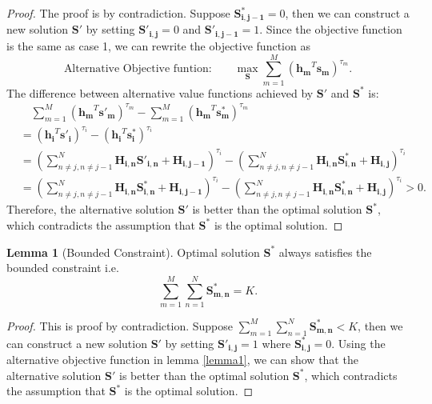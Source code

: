 \documentclass[12pt]{article}
\theoremstyle{definition}
\newtheorem{lemma}[theorem]{Lemma}
\newcommand{\matr}[1]{\mathbf{#1}} %
\begin{document}
\begin{sloppypar}
\begin{proof}
    The proof is by contradiction. Suppose $\matr{S^*_{i,j-1}} = 0$, then we can construct a new solution $\matr{S'}$ by setting $\matr{S'_{i,j}} = 0$ and $\matr{S'_{i,j-1}} = 1$. Since the objective function is the same as case 1, we can rewrite the objective function as 
    \begin{equation}
        \text{Alternative Objective funtion:} \qquad \max_{\matr{S}} \sum_{m=1}^{M}(\matr{h_m}^T \matr{s_m})^{\tau_m}.
    \end{equation}
    The difference between alternative value functions achieved by $\matr{S'}$ and $\matr{S^*}$ is:
    \begin{equation*}
    \begin{aligned}
        &\quad \sum_{m=1}^{M}(\matr{h_m}^T \matr{s'_m})^{\tau_m} - \sum_{m=1}^{M}(\matr{h_m}^T \matr{s^*_m})^{\tau_m} \\
        &= (\matr{h_i}^T \matr{s'_i})^{\tau_i} - (\matr{h_i}^T \matr{s^*_i})^{\tau_i} \\
        &= (\sum\limits_{n \neq j, n \neq j-1}^{N} \matr{H_{i,n}} \matr{S'_{i,n}}+\matr{H_{i,j-1}})^{\tau_i} - (\sum\limits_{n \neq j, n \neq j-1}^{N} \matr{H_{i,n}} \matr{S^*_{i,n}}+\matr{H_{i,j}})^{\tau_i}\\
        &= (\sum\limits_{n \neq j, n \neq j-1}^{N} \matr{H_{i,n}} \matr{S^*_{i,n}}+\matr{H_{i,j-1}})^{\tau_i} - (\sum\limits_{n \neq j, n \neq j-1}^{N} \matr{H_{i,n}} \matr{S^*_{i,n}}+\matr{H_{i,j}})^{\tau_i}> 0.
    \end{aligned}
    \end{equation*}
    Therefore, the alternative solution $\matr{S'}$ is better than the optimal solution $\matr{S^*}$, which contradicts the assumption that $\matr{S^*}$ is the optimal solution.
\end{proof}

\begin{lemma}[Bounded Constraint]\label{lemma2}
    Optimal solution $\matr{S^*}$ always satisfies the bounded constraint i.e.
    \begin{equation*}
        \sum_{m=1}^{M}\sum_{n=1}^{N}\matr{S^*_{m,n}} = K.
    \end{equation*}
\end{lemma}
\begin{proof}
    This is proof by contradiction. Suppose $\sum_{m=1}^{M}\sum_{n=1}^{N}\matr{S^*_{m,n}} < K$, then we can construct a new solution $\matr{S'}$ by setting $\matr{S'_{i,j}} = 1$ where $\matr{S^*_{i,j}} = 0$. Using the alternative objective function in lemma \ref{lemma1}, we can show that the alternative solution $\matr{S'}$ is better than the optimal solution $\matr{S^*}$, which contradicts the assumption that $\matr{S^*}$ is the optimal solution.
\end{proof}


\end{sloppypar}
\end{document}
